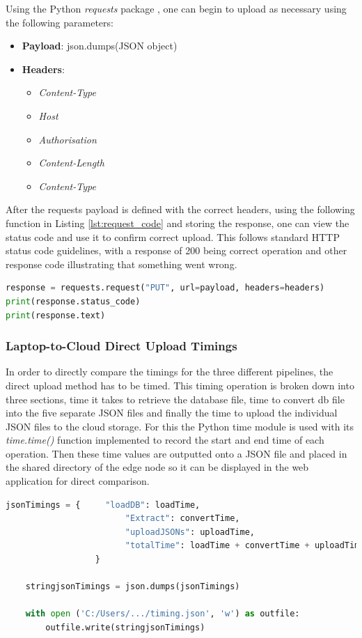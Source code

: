 Using the Python \textit{requests} package \cite{python_requests_lib}, one can begin to upload as necessary using the following parameters:
\begin{itemize}
    \item \textbf{Payload}: json.dumps(JSON object)
    \item \textbf{Headers}:\begin{itemize}
        \item \textit{Content-Type}
        \item \textit{Host}
        \item \textit{Authorisation}
        \item \textit{Content-Length}
        \item \textit{Content-Type}
    \end{itemize}
\end{itemize}
After the requests payload is defined with the correct headers, using the following function in Listing \ref{lst:request_code} and storing the response, one can view the status code and use it to confirm correct upload. This follows standard HTTP status code guidelines, with a response of 200 being correct operation and other response code illustrating that something went wrong.
\begin{lstlisting}[language=Python, caption={Requests Library Usage}, label={lst:request_code}]
response = requests.request("PUT", url=payload, headers=headers)
print(response.status_code)
print(response.text)
\end{lstlisting}

\subsubsection{Laptop-to-Cloud Direct Upload Timings}

In order to directly compare the timings for the three different pipelines, the direct upload method has to be timed. This timing operation is broken down into three sections, time it takes to retrieve the database file, time to convert db file into the five separate JSON files and finally the time to upload the individual JSON files to the cloud storage. For this the Python time module is used with its \textit{time.time()} function implemented to record the start and end time of each operation. Then these time values are outputted onto a JSON file and placed in the shared directory of the edge node so it can be displayed in the web application for direct comparison. 

\begin{lstlisting}[language=Python, caption={Laptop-to-Cloud Timing Code Snippet},
label={lst:ltc code}]
jsonTimings = { 	"loadDB": loadTime,
                        "Extract": convertTime,
                        "uploadJSONs": uploadTime,
                        "totalTime": loadTime + convertTime + uploadTime
                  }
    
    stringjsonTimings = json.dumps(jsonTimings)

    with open ('C:/Users/.../timing.json', 'w') as outfile:
        outfile.write(stringjsonTimings)
\end{lstlisting}






